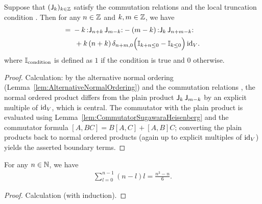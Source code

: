 \begin{lemma}
  \label{lem:CommutatorSugawaraNormalOrderedPair}
  \leanok
  Suppose that $(\mathsf{J}_{k})_{k \in \mathbb{Z}}$ satisfy the commutation relations
  \tagHeiComm{} and the local truncation condition
  \tagHeiTrunc{}. Then for any $n \in \mathbb{Z}$ and $k, m \in \mathbb{Z}$, we have
  \begin{align*}
    [\Loper_n, \normalOrder{\Joper_k \, \Joper_{m-k}}]
    = \; &
    -k \, \normalOrder{\Joper_{n+k} \, \Joper_{m-k}}
    - (m-k) \, \normalOrder{\Joper_{k} \, \Joper_{n+m-k}} \\
      & \; + k \, (n+k) \, \delta_{n+m,0}
        \Big( \indicator{k + n \le 0} - \indicator{k \le 0} \Big) \, \id_V .
  \end{align*}
  where $\mathbb{I}_{{\mathrm{condition}}}$ is defined as $1$ if the condition is true
  and $0$ otherwise.
\end{lemma}
\begin{proof}
  \leanok
  Calculation: by the alternative normal ordering
  (Lemma~\ref{lem:AlternativeNormalOrdering}) and the commutation relations \tagHeiComm{},
  the normal ordered product differs from the plain product
  $\mathsf{J}_k \, \mathsf{J}_{m-k}$ by an explicit multiple of $\mathrm{id}_V$, which is central.
  The commutator with the plain product is evaluated using
  Lemma~\ref{lem:CommutatorSugawaraHeisenberg}
  and the commutator formula $[A,BC] = B[A,C] + [A,B]C$; converting the plain products back
  to normal ordered products (again up to explicit multiples of $\mathrm{id}_V$)
  yields the asserted boundary terms.
\end{proof}

\begin{lemma}
  \label{lem:AuxiliaryCentralChargeCalculation}
  \leanok
  For any $n \in \mathbb{N}$, we have
  \begin{align*}
    \sum_{l=0}^{n-1} (n-l) l = \frac{n^3 - n}{6} .
  \end{align*}
\end{lemma}
\begin{proof}
  \leanok
  Calculation (with induction).
\end{proof}

